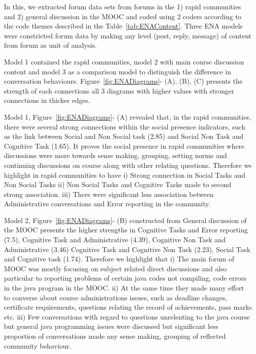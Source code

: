 \documentclass[manuscript,screen,review]{acmart}
\begin{document}
In this, we extracted forum data sets from forums in the 1) rapid communities and 2) general discussion in the MOOC and coded using 2 coders according to the code themes described in the Table~\ref{tab:ENAContent}. Three ENA models were constricted forum data by making any level (post, reply, message) of content from forum as unit of analysis.

Model 1 contained the rapid communities, model 2 with main course discussion content and model 3 as a comparison model to distinguish the difference in conversation behaviours.  Figure~\ref{fig:ENADiagrams}- (A), (B), (C) presents the strength of each connections all 3 diagrams with higher values with stronger connections in thicker edges. 

Model 1, Figure~\ref{fig:ENADiagrams}- (A) revealed that, in the rapid communities, there were several strong connections within the social presence indicators, such as the link between Social and Non Social task (2.85) and Social Non Task and Cognitive Task (1.65). It proves the social presence in rapid communities where discussions were more towards sense making, grouping, setting norms and continuing discussions on course along with other relating questions. Therefore we highlight in rapid communities to have i) Strong connection in Social Tasks and Non Social Tasks ii) Non Social Tasks and Cognitive Tasks made to second strong association. iii) There were significant less association between  Administrative conversations and Error reporting in the community. 

Model 2, Figure~\ref{fig:ENADiagrams}- (B) constructed from General discussion of the MOOC presents the higher strengths in Cognitive Tasks and Error reporting (7.5), Cognitive Task and Administrative (4.39), Cognitive Non Task and Administrative (3.46) Cognitive Task and Cognitive Non Task (2.23), Social Task and Cognitive task (1.74). Therefore we highlight that  i) The main forum of MOOC was mostly focusing on subject related direct discussions and also particular to reporting problems of certain java codes not compiling, code errors in the java program in the MOOC. ii) At the same time they made many effort to converse about course administrations issues, such as deadline changes, certificate requirements, questions relating the record of achievements, pass marks etc. iii) Few conversations with regard to questions unrelenting to the java course but general java programming issues were discussed but significant less proportion of conversations made any sense making, grouping of reflected community behaviour. 
\end{document}
